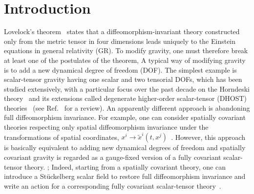 \documentclass[aps,prd,preprintnumbers,superscriptaddress,nofootinbib,notitlepage]{revtex4-2}
\begin{document}
\section{Introduction}



Lovelock's theorem~\cite{Lovelock:1971yv,Lovelock:1972vz} states that a diffeomorphism-invariant theory constructed only from the metric tensor in four dimensions leads uniquely to the Einstein equations in general relativity (GR).
To modify gravity, one must therefore break at least one of the postulates of the theorem,
A typical way of modifying gravity is to add a new dynamical degree of freedom (DOF).
The simplest example is scalar-tensor gravity having one scalar and two tensorial DOFs,
which has been studied extensively, with a particular focus over the past decade on the Horndeski theory~\cite{Horndeski:1974wa,Deffayet:2011gz,Kobayashi:2011nu} and its extensions called degenerate higher-order scalar-tensor (DHOST) theories~\cite{Zumalacarregui:2013pma,Gleyzes:2014dya,Langlois:2015cwa,Crisostomi:2016czh,BenAchour:2016fzp,BenAchour:2016cay} (see Ref.~\cite{Kobayashi:2019hrl} for a review).
An apparently different approach is abandoning full diffeomorphism invariance.
For example, one can consider spatially covariant theories respecting only spatial diffeomorphism invariance under the transformations of spatial coordinates, $x^i\to \tilde x^i(t,x^j)$~\cite{Gao:2014soa,Gao:2014fra}.
However, this approach is basically equivalent to adding new dynamical degrees of freedom and spatially covariant gravity is regarded as a gauge-fixed version of a fully covariant scalar-tensor theory.
; Indeed, starting from a spatially covariant theory, one can introduce a St\"{u}ckelberg scalar field to restore full diffeomorphism invariance and write an action for a corresponding fully covariant scalar-tensor theory~\cite{Gao:2020yzr}.


\end{document}
